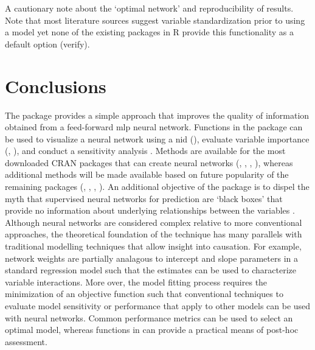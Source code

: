 \documentclass[article,shortnames]{jss}\usepackage[]{graphicx}\usepackage[]{color}
\begin{document}
A cautionary note about the `optimal network' and reproducibility of results.  Note that most literature sources suggest variable standardization prior to using a model yet none of the existing packages in R provide this functionality as a default option (verify).    

\section[Conclusions]{Conclusions}

The  package provides a simple approach that improves the quality of information obtained from a feed-forward \ac{mlp} neural network.  Functions in the package can be used to visualize a neural network using a \acl{nid} (), evaluate variable importance (, ), and conduct a sensitivity analysis .  Methods are available for the most downloaded \ac{CRAN} packages that can create neural networks (, , , ), whereas additional methods will be made available based on future popularity of the remaining packages (, , , ).  An additional objective of the package is to dispel the myth that supervised neural networks for prediction are `black boxes' that provide no information about underlying relationships between the variables \citep{Olden02}.  Although neural networks are considered complex relative to more conventional approaches, the theoretical foundation of the technique has many parallels with traditional modelling techniques that allow insight into causation.  For example, network weights are partially analagous to intercept and slope parameters in a standard regression model such that the estimates can be used to characterize variable interactions.  More over, the model fitting process requires the minimization of an objective function such that conventional techniques to evaluate model sensitivity or performance that apply to other models can be used with neural networks.  Common performance metrics can be used to select an optimal model, whereas functions in  can provide a practical means of post-hoc assessment. 
\end{document}
